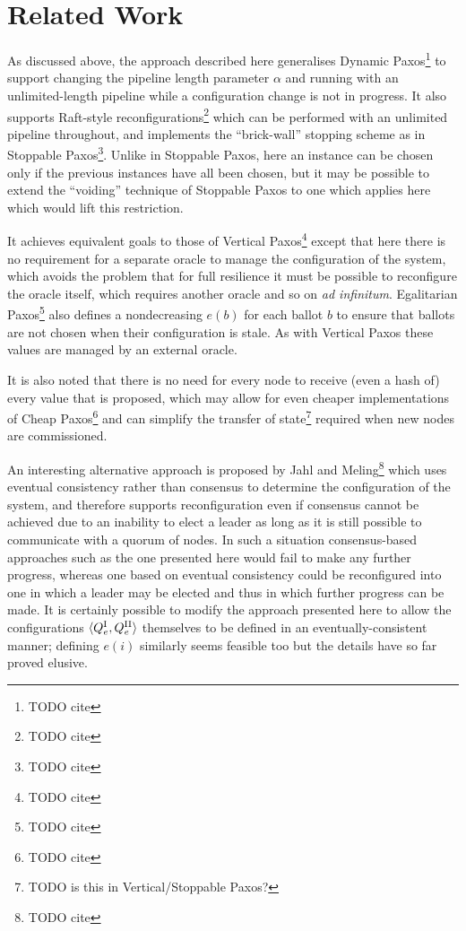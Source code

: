 \documentclass[journal]{IEEEtran}
\begin{document}
\section{Related Work}

As discussed above, the approach described here generalises Dynamic
Paxos\footnote{TODO cite} to support changing the pipeline length parameter
$\alpha$ and running with an unlimited-length pipeline while a configuration
change is not in progress. It also supports Raft-style
reconfigurations\footnote{TODO cite} which can be performed with an unlimited
pipeline throughout, and implements the ``brick-wall'' stopping scheme as in
Stoppable Paxos\footnote{TODO cite}. Unlike in Stoppable Paxos, here an
instance can be chosen only if the previous instances have all been chosen, but
it may be possible to extend the ``voiding'' technique of Stoppable Paxos to
one which applies here which would lift this restriction.

It achieves equivalent goals to those of Vertical Paxos\footnote{TODO cite}
except that here there is no requirement for a separate oracle to manage the
configuration of the system, which avoids the problem that for full resilience
it must be possible to reconfigure the oracle itself, which requires another
oracle and so on \textit{ad infinitum}. Egalitarian Paxos\footnote{TODO cite}
also defines a nondecreasing $e(b)$ for each ballot $b$ to ensure that ballots
are not chosen when their configuration is stale. As with Vertical Paxos these
values are managed by an external oracle.

It is also noted that there is no need for every node to receive (even a hash
of) every value that is proposed, which may allow for even cheaper
implementations of Cheap Paxos\footnote{TODO cite} and can simplify the
transfer of state\footnote{TODO is this in Vertical/Stoppable Paxos?} required
when new nodes are commissioned.

An interesting alternative approach is proposed by Jahl and
Meling\footnote{TODO cite} which uses eventual consistency rather than
consensus to determine the configuration of the system, and therefore supports
reconfiguration even if consensus cannot be achieved due to an inability to
elect a leader as long as it is still possible to communicate with a quorum of
nodes. In such a situation consensus-based approaches such as the one presented
here would fail to make any further progress, whereas one based on eventual
consistency could be reconfigured into one in which a leader may be elected and
thus in which further progress can be made.  It is certainly possible to modify
the approach presented here to allow the configurations $\langle {Q}^\textrm{I}_{e},
{Q}^\textrm{II}_{e} \rangle$ themselves to be defined in an eventually-consistent manner;
defining $e(i)$ similarly seems feasible too but the details have so far proved
elusive.
\end{document}
